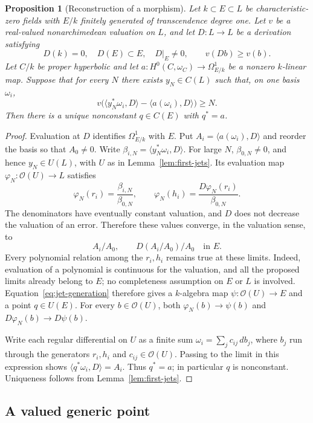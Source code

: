 \documentclass[11pt,a4paper]{article}
\numberwithin{equation}{section}
\theoremstyle{plain}
\newtheorem{proposition}[theorem]{Proposition}
\theoremstyle{definition}
\theoremstyle{remark}
\newcommand{\cO}{\mathcal O}
\begin{document}
\begin{proposition}[Reconstruction of a morphism]
\label{prop:reconstruction}
Let $k\subset E\subset L$ be characteristic-zero fields with $E/k$
finitely generated of transcendence degree one. Let $v$ be a real-valued
nonarchimedean valuation on $L$, and let $D:L\to L$ be a derivation satisfying
\[
 D(k)=0,\quad D(E)\subset E,\quad D|_E\ne0,\qquad v(Db)\ge v(b).
\]
Let $C/k$ be proper hyperbolic and let
$a:H^0(C,\omega_C)\to\Omega^1_{E/k}$ be a nonzero $k$-linear map.
Suppose that for every $N$ there exists $y_N\in C(L)$ such that, on one
basis $\omega_i$,
\[
 v\bigl(\langle y_N^*\omega_i,D\rangle-
             \langle a(\omega_i),D\rangle\bigr)\ge N.
\]
Then there is a unique nonconstant $q\in C(E)$ with $q^*=a$.
\end{proposition}
\begin{proof}
Evaluation at $D$ identifies $\Omega^1_{E/k}$ with $E$. Put
$A_i=\langle a(\omega_i),D\rangle$ and reorder the basis so that
$A_0\ne0$. Write $\beta_{i,N}=\langle y_N^*\omega_i,D\rangle$.
For large $N$, $\beta_{0,N}\ne0$, and hence $y_N\in U(L)$, with $U$
as in Lemma~\ref{lem:first-jets}. Its evaluation map
$\varphi_N:\cO(U)\to L$
satisfies
\[
 \varphi_N(r_i)=\frac{\beta_{i,N}}{\beta_{0,N}},\qquad
 \varphi_N(h_i)=\frac{D\varphi_N(r_i)}{\beta_{0,N}}.
\]
The denominators have eventually constant valuation, and $D$ does not
decrease the valuation of an error. Therefore these values converge, in
the valuation sense, to
\[
 A_i/A_0,\qquad D(A_i/A_0)/A_0\quad\text{in }E.
\]
Every polynomial relation among the $r_i,h_i$ remains true at these
limits. Indeed, evaluation of a polynomial is continuous for the
valuation, and all the proposed limits already belong to $E$; no
completeness assumption on $E$ or $L$ is involved.
Equation~\eqref{eq:jet-generation}
therefore gives a $k$-algebra map $\psi:\cO(U)\to E$ and a point
$q\in U(E)$. For every $b\in\cO(U)$, both $\varphi_N(b)\to\psi(b)$ and
$D\varphi_N(b)\to D\psi(b)$.

Write each regular differential on $U$ as a finite sum
$\omega_i=\sum_j c_{ij}\,db_j$, where $b_j$ run through the generators
$r_i,h_i$ and $c_{ij}\in\cO(U)$. Passing to the limit in this expression
shows $\langle q^*\omega_i,D\rangle=A_i$. Thus $q^*=a$; in particular
$q$ is nonconstant. Uniqueness follows from Lemma~\ref{lem:first-jets}.
\end{proof}

\subsection{A valued generic point}
\end{document}
